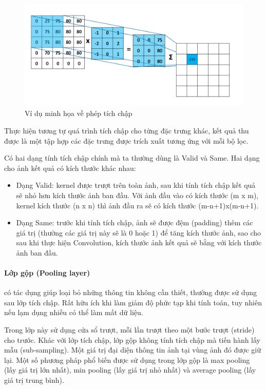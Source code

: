 \begin{figure}[H]
	\begin{center}
		\includegraphics[width=12cm]{images/blood/convExample.png}
		\caption{Ví dụ minh họa về phép tích chập \cite{CNN}}
	\end{center}
\end{figure}

Thực hiện tương tự quá trình tích chập cho từng đặc trưng khác, kết quả thu được là một tập hợp các đặc trưng được trích xuất tương ứng với mỗi bộ lọc. 

Có hai dạng tính tích chập chính mà ta thường dùng là Valid và Same. Hai dạng cho ảnh kết quả có kích thước khác nhau:
\begin{itemize}
	\item Dạng Valid: kernel được trượt trên toàn ảnh, sau khi tính tích chập kết quả sẽ nhỏ hơn kích thước ảnh ban đầu. Với ảnh đầu vào có kích thước (m x m), kernel kích thước (n x n) thì ảnh đầu ra sẽ có kích thước (m-n+1)x(m-n+1). 
	\item Dạng Same: trước khi tính tích chập, ảnh sẽ được đệm (padding) thêm các giá trị (thường các giá trị này sẽ là 0 hoặc 1) để tăng kích thước ảnh, sao cho sau khi thực hiện Convolution, kích thước ảnh kết quả sẽ bằng với kích thước ảnh ban đầu.
\end{itemize}

\paragraph{Lớp gộp (Pooling layer)}có tác dụng giúp loại bỏ những thông tin không cần thiết, thường được sử dụng sau lớp tích chập. Rất hữu ích khi làm giảm độ phức tạp khi tính toán, tuy nhiên nếu lạm dụng nhiều có thể làm mất dữ liệu. \par

Trong lớp này sử dụng cửa sổ trượt, mỗi lần trượt theo một bước trượt (stride) cho trước. Khác với lớp tích chập, lớp gộp không tính tích chập mà tiến hành lấy mẫu (sub-sampling). Một giá trị đại diện thông tin ảnh tại vùng ảnh đó được giữ lại. Một số phương pháp phổ biến được sử dụng trong lớp gộp là max pooling (lấy giá trị lớn nhất), min pooling (lấy giá trị nhỏ nhất) và average pooling (lấy giá trị trung bình). \par

